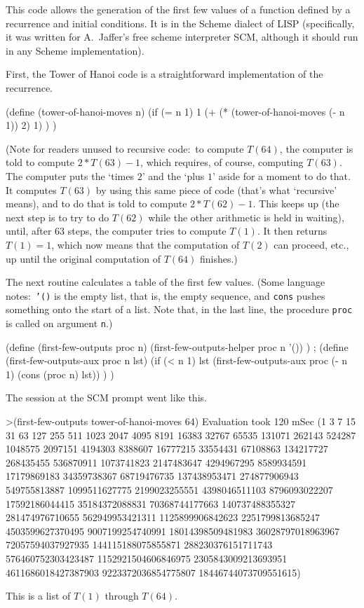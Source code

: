 \announcecomputercode
This code allows the generation of the first few values of a function 
defined by a recurrence and initial conditions.
It is in the Scheme dialect of LISP
(specifically, it was written for A.~Jaffer's free scheme interpreter SCM, 
although it should run in any Scheme implementation).

First,
the Tower of Hanoi code is a straightforward implementation of the recurrence.
\begin{computercode}
(define (tower-of-hanoi-moves n) 
    (if (= n 1)
       1
       (+ (* (tower-of-hanoi-moves (- n 1)) 
              2) 
           1) )  )
\end{computercode}
\noindent (Note for readers unused to recursive code:~to compute $T(64)$, 
the computer is told to compute $2*T(63)-1$, which requires, of course,
computing $T(63)$.
The computer puts the `times $2$' and the `plus $1$' aside for a moment
to do that.
It computes  $T(63)$ by using this same piece of code (that's 
what `recursive' means), and to do that is told to compute $2*T(62)-1$.
This keeps up (the next step is to try to do $T(62)$ while the other 
arithmetic is held in waiting), until, after $63$ steps, the computer
tries to compute $T(1)$.
It then returns $T(1)=1$, 
which now means that the computation of $T(2)$ can proceed,
etc., up until the original computation of $T(64)$ finishes.)

The next routine calculates a table of the first few 
values.
(Some language notes:~\texttt{'()} is the empty list, that is, 
the empty sequence, and \texttt{cons} pushes something onto the start of a 
list.
Note that, in the last line, the procedure \texttt{proc}
is called on argument \texttt{n}.)
\begin{computercode}
(define (first-few-outputs proc n)
    (first-few-outputs-helper proc n '()) )
;
(define (first-few-outputs-aux proc n lst)
    (if (< n 1)
    lst 
    (first-few-outputs-aux proc (- n 1) (cons (proc n) lst)) ) )
\end{computercode}
\noindent The session at the SCM prompt went like this.
\begin{computercode}
>(first-few-outputs tower-of-hanoi-moves 64)
Evaluation took 120 mSec
(1 3 7 15 31 63 127 255 511 1023 2047 4095 8191 16383 32767 
65535 131071 262143 524287 1048575 2097151 4194303 8388607 
16777215 33554431 67108863 134217727 268435455 536870911 
1073741823 2147483647 4294967295 8589934591 17179869183 
34359738367 68719476735 137438953471 274877906943 549755813887 
1099511627775 2199023255551 4398046511103 8796093022207 
17592186044415 35184372088831 70368744177663 140737488355327 
281474976710655 562949953421311 1125899906842623 
2251799813685247 4503599627370495 9007199254740991 
18014398509481983 36028797018963967 72057594037927935 
144115188075855871 288230376151711743 576460752303423487 
1152921504606846975 2305843009213693951 4611686018427387903 
9223372036854775807 18446744073709551615)
\end{computercode}
\noindent This is a list of $T(1)$ through $T(64)$.
\endinput

